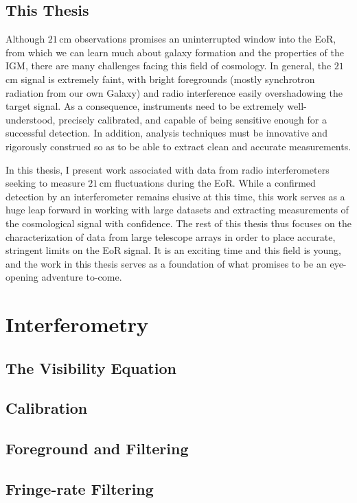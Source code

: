 \subsection{This Thesis}

Although $21$\,cm observations promises an uninterrupted window into the EoR, from which we can learn much about galaxy formation and the properties of the IGM, there are many challenges facing this field of cosmology. In general, the $21$\,cm signal is extremely faint, with bright foregrounds (mostly synchrotron radiation from our own Galaxy) and radio interference easily overshadowing the target signal. As a consequence, instruments need to be extremely well-understood, precisely calibrated, and capable of being sensitive enough for a successful detection. In addition, analysis techniques must be innovative and rigorously construed so as to be able to extract clean and accurate measurements.

In this thesis, I present work associated with data from radio interferometers seeking to measure $21$\,cm fluctuations during the EoR. While a confirmed detection by an interferometer remains elusive at this time, this work serves as a huge leap forward in working with large datasets and extracting measurements of the cosmological signal with confidence. The rest of this thesis thus focuses on the characterization of data from large telescope arrays in order to place accurate, stringent limits on the EoR signal. It is an exciting time and this field is young, and the work in this thesis serves as a foundation of what promises to be an eye-opening adventure to-come.

\section{Interferometry}
\label{sec:interferometry}

\subsection{The Visibility Equation}
\subsection{Calibration}
\subsection{Foreground and Filtering}
\subsection{Fringe-rate Filtering}

